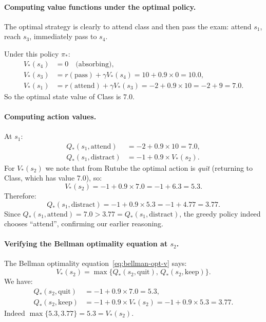 \begin{example}
\paragraph{Computing value functions under the optimal policy.}
The optimal strategy is clearly to attend class and then pass the exam: attend $s_1$, reach $s_3$, immediately pass to $s_4$.

Under this policy $\pi_*$:
\begin{align*}
V_*(s_4) &= 0 \quad \text{(absorbing)}, \\
V_*(s_3) &= r(\text{pass}) + \gamma V_*(s_4) = 10 + 0.9 \times 0 = 10.0, \\
V_*(s_1) &= r(\text{attend}) + \gamma V_*(s_3) = -2 + 0.9 \times 10 = -2 + 9 = 7.0.
\end{align*}
So the optimal state value of Class is $7.0$.

\paragraph{Computing action values.}
At $s_1$:
\begin{align*}
Q_*(s_1, \text{attend})   &= -2 + 0.9 \times 10 = 7.0, \\
Q_*(s_1, \text{distract}) &= -1 + 0.9 \times V_*(s_2).
\end{align*}
For $V_*(s_2)$ we note that from Rutube the optimal action is \emph{quit} (returning to Class, which has value $7.0$), so:
\[
V_*(s_2) = -1 + 0.9 \times 7.0 = -1 + 6.3 = 5.3.
\]
Therefore:
\[
Q_*(s_1, \text{distract}) = -1 + 0.9 \times 5.3 = -1 + 4.77 = 3.77.
\]
Since $Q_*(s_1, \text{attend}) = 7.0 > 3.77 = Q_*(s_1, \text{distract})$, the greedy policy indeed chooses ``attend'', confirming our earlier reasoning.

\paragraph{Verifying the Bellman optimality equation at $s_2$.}
The Bellman optimality equation~\eqref{eq:bellman-opt-v} says:
\[
V_*(s_2)
= \max\bigl\{Q_*(s_2, \text{quit}),\, Q_*(s_2, \text{keep})\bigr\}.
\]
We have:
\begin{align*}
Q_*(s_2, \text{quit}) &= -1 + 0.9 \times 7.0 = 5.3, \\
Q_*(s_2, \text{keep}) &= -1 + 0.9 \times V_*(s_2) = -1 + 0.9 \times 5.3 = 3.77.
\end{align*}
Indeed $\max\{5.3, 3.77\} = 5.3 = V_*(s_2)$. \checkmark
\end{example}


